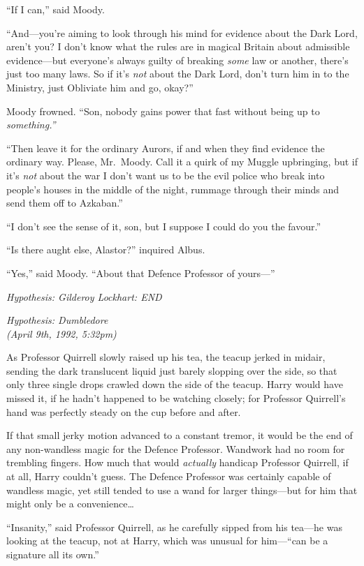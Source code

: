``If I can,'' said Moody.

``And---you're aiming to look through his mind for evidence about the
Dark Lord, aren't you? I don't know what the rules are in magical
Britain about admissible evidence---but everyone's always guilty of
breaking \emph{some} law or another, there's just too many laws. So if
it's \emph{not} about the Dark Lord, don't turn him in to the Ministry,
just Obliviate him and go, okay?''

Moody frowned. ``Son, nobody gains power that fast without being up to
\emph{something.''}

``Then leave it for the ordinary Aurors, if and when they find evidence
the ordinary way. Please, Mr.~Moody. Call it a quirk of my Muggle
upbringing, but if it's \emph{not} about the war I don't want us to be
the evil police who break into people's houses in the middle of the
night, rummage through their minds and send them off to Azkaban.''

``I don't see the sense of it, son, but I suppose I could do you the
favour.''

``Is there aught else, Alastor?'' inquired Albus.

``Yes,'' said Moody. ``About that Defence Professor of yours---''

\emph{Hypothesis: Gilderoy Lockhart: END}

\emph{Hypothesis: Dumbledore}\\\emph{(April 9th, 1992, 5:32pm)}

As Professor Quirrell slowly raised up his tea, the teacup jerked in
midair, sending the dark translucent liquid just barely slopping over
the side, so that only three single drops crawled down the side of the
teacup. Harry would have missed it, if he hadn't happened to be watching
closely; for Professor Quirrell's hand was perfectly steady on the cup
before and after.

If that small jerky motion advanced to a constant tremor, it would be
the end of any non-wandless magic for the Defence Professor. Wandwork
had no room for trembling fingers. How much that would \emph{actually}
handicap Professor Quirrell, if at all, Harry couldn't guess. The
Defence Professor was certainly capable of wandless magic, yet still
tended to use a wand for larger things---but for him that might only be
a convenience\ldots{}

``Insanity,'' said Professor Quirrell, as he carefully sipped from his
tea---he was looking at the teacup, not at Harry, which was unusual for
him---``can be a signature all its own.''

